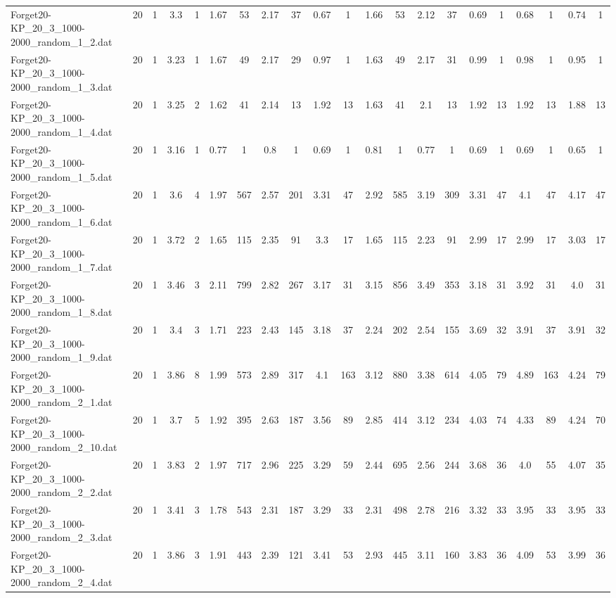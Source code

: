 \begin{sidewaystable}[!ht]
{\begin{tabular}{lcccccccccccccccccccc}
Forget20-KP\_20\_3\_1000-2000\_random\_1\_2.dat & 20 & 1 & 3.3 & 1 & 1.67 & 53 & 2.17 & 37 & 0.67 & 1 & 1.66 & 53 & 2.12 & 37 & 0.69 & 1 & 0.68 & 1 & 0.74 & 1 \\
Forget20-KP\_20\_3\_1000-2000\_random\_1\_3.dat & 20 & 1 & 3.23 & 1 & 1.67 & 49 & 2.17 & 29 & 0.97 & 1 & 1.63 & 49 & 2.17 & 31 & 0.99 & 1 & 0.98 & 1 & 0.95 & 1 \\
Forget20-KP\_20\_3\_1000-2000\_random\_1\_4.dat & 20 & 1 & 3.25 & 2 & 1.62 & 41 & 2.14 & 13 & 1.92 & 13 & 1.63 & 41 & 2.1 & 13 & 1.92 & 13 & 1.92 & 13 & 1.88 & 13 \\
Forget20-KP\_20\_3\_1000-2000\_random\_1\_5.dat & 20 & 1 & 3.16 & 1 & 0.77 & 1 & 0.8 & 1 & 0.69 & 1 & 0.81 & 1 & 0.77 & 1 & 0.69 & 1 & 0.69 & 1 & 0.65 & 1 \\
Forget20-KP\_20\_3\_1000-2000\_random\_1\_6.dat & 20 & 1 & 3.6 & 4 & 1.97 & 567 & 2.57 & 201 & 3.31 & 47 & 2.92 & 585 & 3.19 & 309 & 3.31 & 47 & 4.1 & 47 & 4.17 & 47 \\
Forget20-KP\_20\_3\_1000-2000\_random\_1\_7.dat & 20 & 1 & 3.72 & 2 & 1.65 & 115 & 2.35 & 91 & 3.3 & 17 & 1.65 & 115 & 2.23 & 91 & 2.99 & 17 & 2.99 & 17 & 3.03 & 17 \\
Forget20-KP\_20\_3\_1000-2000\_random\_1\_8.dat & 20 & 1 & 3.46 & 3 & 2.11 & 799 & 2.82 & 267 & 3.17 & 31 & 3.15 & 856 & 3.49 & 353 & 3.18 & 31 & 3.92 & 31 & 4.0 & 31 \\
Forget20-KP\_20\_3\_1000-2000\_random\_1\_9.dat & 20 & 1 & 3.4 & 3 & 1.71 & 223 & 2.43 & 145 & 3.18 & 37 & 2.24 & 202 & 2.54 & 155 & 3.69 & 32 & 3.91 & 37 & 3.91 & 32 \\
Forget20-KP\_20\_3\_1000-2000\_random\_2\_1.dat & 20 & 1 & 3.86 & 8 & 1.99 & 573 & 2.89 & 317 & 4.1 & 163 & 3.12 & 880 & 3.38 & 614 & 4.05 & 79 & 4.89 & 163 & 4.24 & 79 \\
Forget20-KP\_20\_3\_1000-2000\_random\_2\_10.dat & 20 & 1 & 3.7 & 5 & 1.92 & 395 & 2.63 & 187 & 3.56 & 89 & 2.85 & 414 & 3.12 & 234 & 4.03 & 74 & 4.33 & 89 & 4.24 & 70 \\
Forget20-KP\_20\_3\_1000-2000\_random\_2\_2.dat & 20 & 1 & 3.83 & 2 & 1.97 & 717 & 2.96 & 225 & 3.29 & 59 & 2.44 & 695 & 2.56 & 244 & 3.68 & 36 & 4.0 & 55 & 4.07 & 35 \\
Forget20-KP\_20\_3\_1000-2000\_random\_2\_3.dat & 20 & 1 & 3.41 & 3 & 1.78 & 543 & 2.31 & 187 & 3.29 & 33 & 2.31 & 498 & 2.78 & 216 & 3.32 & 33 & 3.95 & 33 & 3.95 & 33 \\
Forget20-KP\_20\_3\_1000-2000\_random\_2\_4.dat & 20 & 1 & 3.86 & 3 & 1.91 & 443 & 2.39 & 121 & 3.41 & 53 & 2.93 & 445 & 3.11 & 160 & 3.83 & 36 & 4.09 & 53 & 3.99 & 36 \\

\end{tabular}}
\end{sidewaystable}
